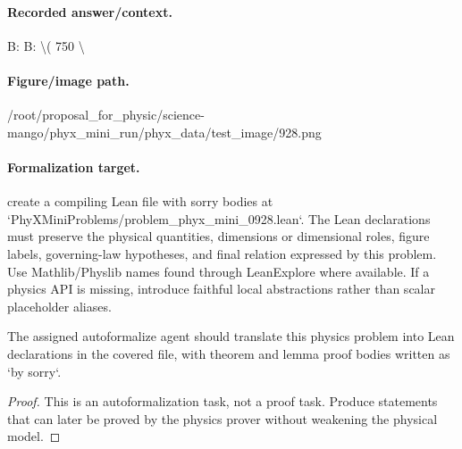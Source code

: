 \paragraph{Recorded answer/context.}
B: B: \textbackslash{}( 750 \textbackslash{}

\paragraph{Figure/image path.}
/root/proposal\_for\_physic/science-mango/phyx\_mini\_run/phyx\_data/test\_image/928.png

\paragraph{Formalization target.}
create a compiling Lean file with sorry bodies at `PhyXMiniProblems/problem\_phyx\_mini\_0928.lean`. The Lean declarations must preserve the physical quantities, dimensions or dimensional roles, figure labels, governing-law hypotheses, and final relation expressed by this problem.
Use Mathlib/Physlib names found through LeanExplore where available. If a physics API is missing, introduce faithful local abstractions rather than scalar placeholder aliases.

\begin{theorem}
\label{thm:physics:phyx_mini_0928:target}
The assigned autoformalize agent should translate this physics problem into Lean declarations in the covered file, with theorem and lemma proof bodies written as `by sorry`.
\end{theorem}
\begin{proof}
This is an autoformalization task, not a proof task. Produce statements that can later be proved by the physics prover without weakening the physical model.
\end{proof}

